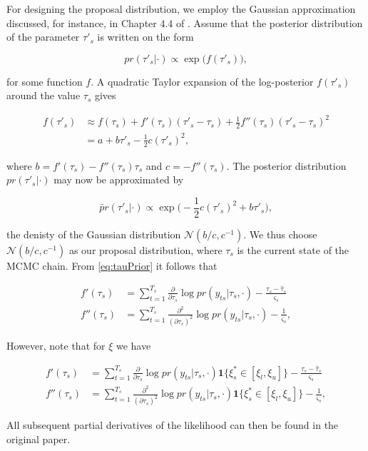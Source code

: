 \documentclass[11pt,english]{article}
\newcommand{\mc}[1]{\mathcal{#1}}
\newcommand{\pderiv}[2]{\frac{\partial #1}{\partial #2}}
\newcommand{\pderivsq}[1]{\frac{\partial^2}{(\partial #1)^2}}
\newcommand{\bl}{\begin{linenomath}}
\newcommand{\el}{\end{linenomath}}
\begin{document}
For designing the proposal distribution, we employ the Gaussian approximation discussed, for instance, in Chapter 4.4 of \cite{RueHeld2005}.  Assume that the posterior distribution of the parameter $\tau'_s$ is written on the form
\bl\[
pr(\tau'_s| \cdot) \propto \exp \big( f(\tau'_s) \big),
\]\el
for some function $f$.  A quadratic Taylor expansion of the log-posterior $f(\tau'_s)$ around the value $\tau_s$ gives 
\bl\begin{align*}
f(\tau'_s) & \approx f(\tau_s) + f'(\tau_s) ( \tau'_s - \tau_s) + \frac{1}{2} f''(\tau_s) (\tau'_s - \tau_s)^2 \\
& = a + b \tau'_s - \frac{1}{2} c (\tau'_s)^2, 
\end{align*}\el
where $b = f'(\tau_s) - f''(\tau_s) \tau_s$ and $c = -f''(\tau_s)$.  The posterior distribution $pr(\tau'_s | \cdot)$ may now be approximated by 
\bl\[
\widetilde{pr}(\tau'_s | \cdot) \propto \exp \Big( -\frac{1}{2} c (\tau'_s)^2 + b \tau'_s \Big), 
\]\el 
the denisty of the Gaussian distribution $\mc{N}(b/c, c^{-1})$. We thus choose $\mc{N}(b/c, c^{-1})$ as our proposal distribution, where $\tau_s$ is the current state of the MCMC chain.  From \eqref{eq:tauPrior} it follows that 
\bl\begin{align*}
f'(\tau_s) &= \sum_{t = 1}^{T_s} \pderiv{}{\tau_s} \log pr(y_{ts}|\tau_s, \cdot) - \frac{\tau_s - \hat{\tau}_s}{\varsigma_s}\\
f''(\tau_s) &= \sum_{t = 1}^{T_s} \pderivsq{\tau_s} \log pr(y_{ts}|\tau_s, \cdot) - \frac{1}{\varsigma_s},
\end{align*}\el 
However, note that for $\xi$ we have
\bl\begin{align*}
f'(\tau_s) &= \sum_{t = 1}^{T_s} \pderiv{}{\tau_s} \log pr(y_{ts}|\tau_s, \cdot)\mathbf{1}\{\xi^{*}_s \in [\xi_l,\xi_u]\}- \frac{\tau_s - \hat{\tau}_s}{\varsigma_s}\\
f''(\tau_s) &= \sum_{t = 1}^{T_s} \pderivsq{\tau_s} \log pr(y_{ts}|\tau_s, \cdot)\mathbf{1}\{\xi^{*}_s \in [\xi_l,\xi_u]\} - \frac{1}{\varsigma_s},
\end{align*}\el 
All subsequent partial derivatives of the likelihood can then be found in the original paper.
\end{document}
